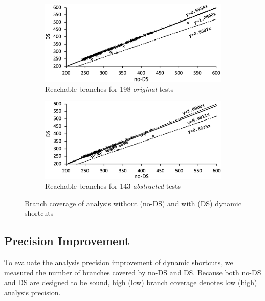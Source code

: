 \begin{figure}[t]
  \centering
  \begin{subfigure}[t]{0.48\textwidth}
    \includegraphics[width=\linewidth]{img/conc-precision}
    \vspace*{-1.5em}
    \caption{Reachable branches for 198 \textit{original} tests}
    \label{fig:precision-fail}
  \end{subfigure}
  \begin{subfigure}[t]{0.48\textwidth}
    \includegraphics[width=\linewidth]{img/abs-precision}
    \vspace*{-1.5em}
    \caption{Reachable branches for 143 \textit{abstracted} tests}
    \label{fig:precision-branch}
  \end{subfigure}
  \vspace*{-1em}
  \caption{Branch coverage of analysis without (no-DS) and with (DS) dynamic shortcuts}
  \label{fig:precision}
  \vspace*{-1.5em}
\end{figure}



\subsection{Precision Improvement}

To evaluate the analysis precision improvement of dynamic shortcuts,
we measured the number of branches covered by no-DS and DS.
Because both no-DS and DS are designed to be sound,
high (low) branch coverage denotes low (high) analysis precision.

